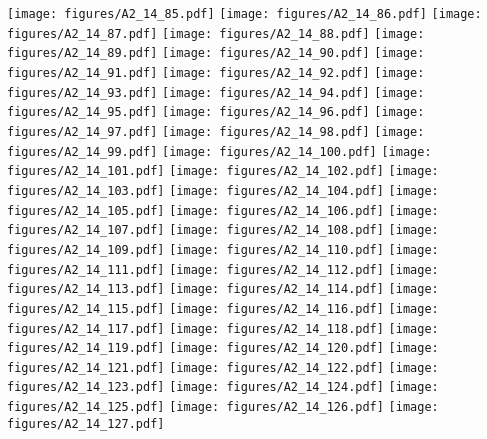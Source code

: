 \documentclass[12pt,a4paper]{article}
\begin{document}
\texttt{[image: figures/A2\_14\_85.pdf]}
\texttt{[image: figures/A2\_14\_86.pdf]}
\texttt{[image: figures/A2\_14\_87.pdf]}
\texttt{[image: figures/A2\_14\_88.pdf]}
\texttt{[image: figures/A2\_14\_89.pdf]}
\texttt{[image: figures/A2\_14\_90.pdf]}
\texttt{[image: figures/A2\_14\_91.pdf]}
\texttt{[image: figures/A2\_14\_92.pdf]}
\texttt{[image: figures/A2\_14\_93.pdf]}
\texttt{[image: figures/A2\_14\_94.pdf]}
\texttt{[image: figures/A2\_14\_95.pdf]}
\texttt{[image: figures/A2\_14\_96.pdf]}
\texttt{[image: figures/A2\_14\_97.pdf]}
\texttt{[image: figures/A2\_14\_98.pdf]}
\texttt{[image: figures/A2\_14\_99.pdf]}
\texttt{[image: figures/A2\_14\_100.pdf]}
\texttt{[image: figures/A2\_14\_101.pdf]}
\texttt{[image: figures/A2\_14\_102.pdf]}
\texttt{[image: figures/A2\_14\_103.pdf]}
\texttt{[image: figures/A2\_14\_104.pdf]}
\texttt{[image: figures/A2\_14\_105.pdf]}
\texttt{[image: figures/A2\_14\_106.pdf]}
\texttt{[image: figures/A2\_14\_107.pdf]}
\texttt{[image: figures/A2\_14\_108.pdf]}
\texttt{[image: figures/A2\_14\_109.pdf]}
\texttt{[image: figures/A2\_14\_110.pdf]}
\texttt{[image: figures/A2\_14\_111.pdf]}
\texttt{[image: figures/A2\_14\_112.pdf]}
\texttt{[image: figures/A2\_14\_113.pdf]}
\texttt{[image: figures/A2\_14\_114.pdf]}
\texttt{[image: figures/A2\_14\_115.pdf]}
\texttt{[image: figures/A2\_14\_116.pdf]}
\texttt{[image: figures/A2\_14\_117.pdf]}
\texttt{[image: figures/A2\_14\_118.pdf]}
\texttt{[image: figures/A2\_14\_119.pdf]}
\texttt{[image: figures/A2\_14\_120.pdf]}
\texttt{[image: figures/A2\_14\_121.pdf]}
\texttt{[image: figures/A2\_14\_122.pdf]}
\texttt{[image: figures/A2\_14\_123.pdf]}
\texttt{[image: figures/A2\_14\_124.pdf]}
\texttt{[image: figures/A2\_14\_125.pdf]}
\texttt{[image: figures/A2\_14\_126.pdf]}
\texttt{[image: figures/A2\_14\_127.pdf]}
\end{document}
